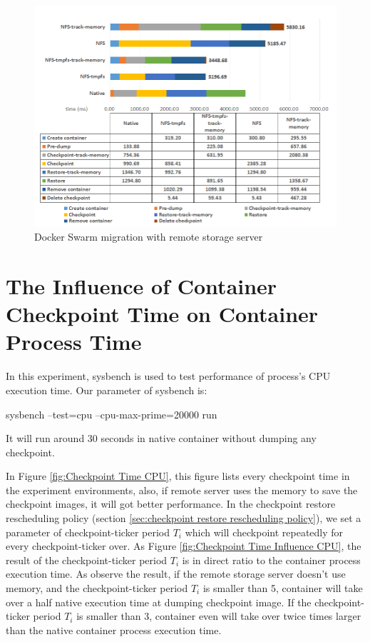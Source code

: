\begin{figure}[hbtp]
\includegraphics[width=17cm]{figure/migration_time.png}
\caption{Docker Swarm migration with remote storage server}
\label{fig:Docker Swarm migration time with remote storage server}
\end{figure}

\section{The Influence of Container Checkpoint Time on Container Process Time}
\label{sec:CPU Time}
In this experiment, sysbench\cite{kopytov2004sysbench} is used to test performance of process's CPU execution time. Our parameter of sysbench is:
\begin{center}
sysbench --test=cpu --cpu-max-prime=20000 run
\end{center}
It will run around 30 seconds in native container without dumping any checkpoint.

In Figure \ref{fig:Checkpoint Time CPU}, this figure lists every checkpoint time in the experiment environments, also, if remote server uses the memory to save the checkpoint images, it will got better performance.
In the checkpoint restore rescheduling policy (section \ref{sec:checkpoint restore rescheduling policy}), we set a parameter of checkpoint-ticker period $ T_i $ which will checkpoint repeatedly for every checkpoint-ticker over.
As Figure \ref{fig:Checkpoint Time Influence CPU}, the result of the checkpoint-ticker period $ T_i $ is in direct ratio to the container process execution time.
As observe the result, if the remote storage server doesn't use memory, and the checkpoint-ticker period $ T_i $ is smaller than 5, container will take over a half native execution time at dumping checkpoint image. If the checkpoint-ticker period $ T_i $ is smaller than 3, container even will take over twice times larger than the native container process execution time.

